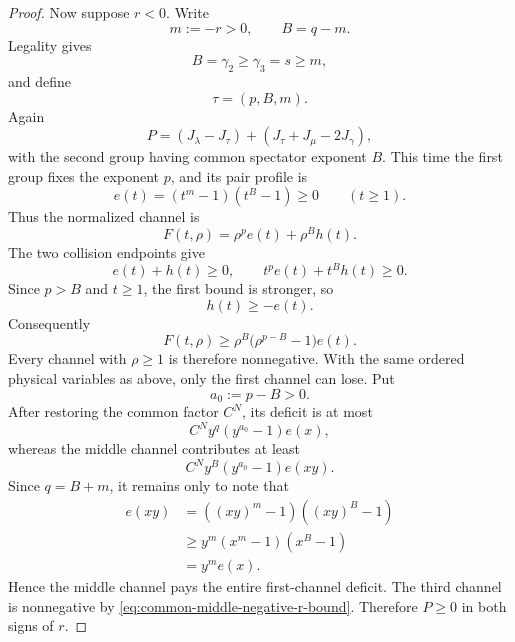 \documentclass[11pt]{article}
\theoremstyle{definition}
\begin{document}
\begin{proof}
Now suppose \(r<0\).  Write
\begin{equation*}
m:=-r>0,
\qquad
B=q-m.
\end{equation*}
Legality gives
\begin{equation*}
B=\gamma_2\ge\gamma_3=s\ge m,
\end{equation*}
and define
\begin{equation*}
\tau=(p,B,m).
\end{equation*}
Again
\begin{equation*}
P=(J_\lambda-J_\tau)+(J_\tau+J_\mu-2J_\gamma),
\end{equation*}
with the second group having common spectator exponent \(B\).  This time the first group fixes the exponent \(p\), and its pair profile is
\begin{equation}\label{eq:common-middle-negative-r-profile}
e(t)=(t^m-1)(t^B-1)\ge0
\qquad(t\ge1).
\end{equation}
Thus the normalized channel is
\begin{equation}\label{eq:common-middle-negative-r-channel}
F(t,\rho)=\rho^p e(t)+\rho^B h(t).
\end{equation}
The two collision endpoints give
\begin{equation*}
e(t)+h(t)\ge0,
\qquad
t^pe(t)+t^Bh(t)\ge0.
\end{equation*}
Since \(p>B\) and \(t\ge1\), the first bound is stronger, so
\begin{equation*}
h(t)\ge-e(t).
\end{equation*}
Consequently
\begin{equation}\label{eq:common-middle-negative-r-bound}
F(t,\rho)
\ge
\rho^B\bigl(\rho^{p-B}-1\bigr)e(t).
\end{equation}
Every channel with \(\rho\ge1\) is therefore nonnegative.  With the same ordered physical variables as above, only the first channel can lose.  Put
\begin{equation*}
a_0:=p-B>0.
\end{equation*}
After restoring the common factor \(C^N\), its deficit is at most
\begin{equation*}
C^N y^q(y^{a_0}-1)e(x),
\end{equation*}
whereas the middle channel contributes at least
\begin{equation*}
C^N y^B(y^{a_0}-1)e(xy).
\end{equation*}
Since \(q=B+m\), it remains only to note that
\begin{align*}
e(xy)
&=((xy)^m-1)((xy)^B-1)\\
&\ge y^m(x^m-1)(x^B-1)\\
&=y^m e(x).
\end{align*}
Hence the middle channel pays the entire first-channel deficit.  The third channel is nonnegative by \eqref{eq:common-middle-negative-r-bound}.  Therefore \(P\ge0\) in both signs of \(r\).
\end{proof}
\end{document}
